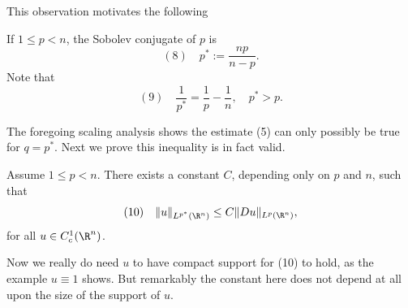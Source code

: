 This observation motivates the following

\begin{definition}
\label{def:sobolev-conjugate-exponent}
If $1 \le p < n$, the Sobolev conjugate of $p$ is
$$(8) \quad p^* := \frac{np}{n - p}.$$
Note that
$$(9) \quad \frac{1}{p^*} = \frac{1}{p} - \frac{1}{n}, \quad p^* > p.$$
\end{definition}

The foregoing scaling analysis shows the estimate (5) can only possibly be true for $q = p^*$. Next we prove this inequality is in fact valid.

\begin{theorem}
\label{thm:gagliardo-nirenberg-sobolev-inequality}
Assume $1 \le p < n$. There exists a constant $C$, depending only on $p$ and $n$, such that
$$(10) \quad \|u\|_{L^{p^*}(\R^n)} \le C\|Du\|_{L^p(\R^n)},$$
for all $u \in C_c^1(\R^n)$.
\end{theorem}

Now we really do need $u$ to have compact support for (10) to hold, as the example $u \equiv 1$ shows. But remarkably the constant here does not depend at all upon the size of the support of $u$.


